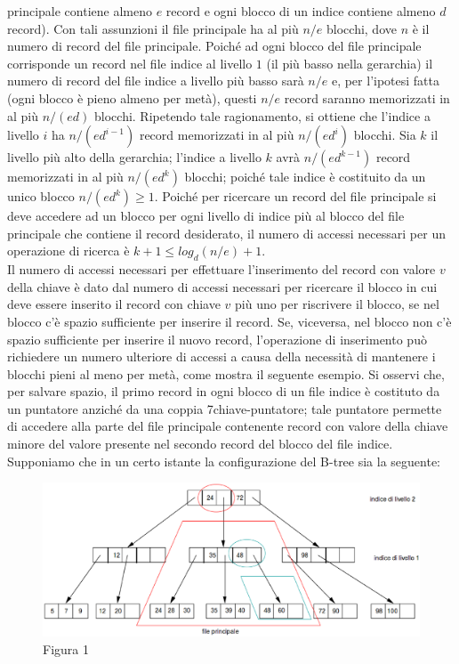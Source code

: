 principale contiene almeno $e$ record e ogni blocco di un indice contiene almeno $d$ record). Con tali
assunzioni il file principale ha al più $n/e$ blocchi, dove $n$ è il numero di record del file principale.
Poiché ad ogni blocco del file principale corrisponde un record nel file indice al livello $1$ (il più
basso nella gerarchia) il numero di record del file indice a livello più basso sarà $n/e$ e, per l'ipotesi
fatta (ogni blocco è pieno almeno per metà), questi $n/e$ record saranno memorizzati in al più $n/(ed)$
blocchi. Ripetendo tale ragionamento, si ottiene che l'indice a livello $i$ ha $n/(ed^{i-1})$ record
memorizzati in al più $n/(ed^i)$ blocchi. Sia $k$ il livello più alto della gerarchia; l'indice a livello
$k$ avrà $n/(ed^{k- 1})$ record memorizzati in al più $n/(ed^k)$ blocchi; poiché tale indice è costituito 
da un unico blocco $n/(ed^k)\geq 1$. Poiché per ricercare un record del file principale si deve accedere 
ad un blocco per ogni livello di indice più al blocco del file principale che contiene il record 
desiderato, il numero di accessi necessari per un operazione di ricerca è $k +1 \leq log_d(n/e)+1$.\\
Il numero di accessi necessari per effettuare l'inserimento del record con valore $v$ della chiave è
dato dal numero di accessi necessari per ricercare il blocco in cui deve essere inserito il record con
chiave $v$ più uno per riscrivere il blocco, se nel blocco c'è spazio sufficiente per inserire il record.
Se, viceversa, nel blocco non c'è spazio sufficiente per inserire il nuovo record, l'operazione di
inserimento può richiedere un numero ulteriore di accessi a causa della necessità di mantenere i
blocchi pieni al meno per metà, come mostra il seguente esempio. Si osservi che, per salvare spazio,
il primo record in ogni blocco di un file indice è costituto da un puntatore anziché da una coppia
7chiave-puntatore; tale puntatore permette di accedere alla parte del file principale contenente record
con valore della chiave minore del valore presente nel secondo record del blocco del file indice.
Supponiamo che in un certo istante la configurazione del B-tree sia la seguente:
\begin{figure}[h!]
  \centering
  \includegraphics[width=430px]{img_5_3_4(1).eps}
  Figura 1
\end{figure}

